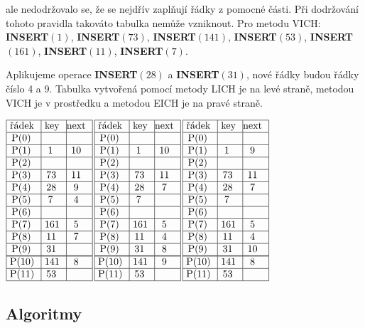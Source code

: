 \documentclass[a4paper,12pt]{article}
\begin{document}
ale nedodržovalo se, že se nejdřív zaplňují řádky z 
pomocné části.  Při dodržování tohoto pravidla takováto tabulka 
nemůže vznik\-nout.\newline 
Pro metodu VICH:\newline 
{\bf INSERT$(1)$}, {\bf INSERT$(73)$}, {\bf INSERT$(141)$}, 
{\bf INSERT$(53)$}, {\bf INSERT$(161)$},\newline 
{\bf INSERT$(11)$}, {\bf INSERT$(7)$}. 

Aplikujeme operace {\bf INSERT$(28)$} a {\bf INSERT$(31
)$}, nové řád\-ky 
budou řádky číslo 4 a 9. Tabulka vytvořená pomocí 
metody LICH je na levé straně, metodou VICH je v 
prostředku a metodou EICH je na pravé straně.

$\vbox {\hbox{\vtop{\offinterlineskip\halign{\strut\vrule\ # & \vrule\ # & \vrule\hfil # \hfil\vrule\cr\noalign{\hrule}řádek & key & next \hfil\cr\noalign{\hrule}P(0) & &\hfill \cr\noalign{\hrule}P(1) & 1 & 10 \cr\noalign{\hrule}P(2) & &\hfill \cr\noalign{\hrule}P(3) & 73 & 11 \cr\noalign{\hrule}P(4) & 28 & 9 \cr\noalign{\hrule}P(5) & 7 & 4 \cr\noalign{\hrule}P(6) &  &\hfill \cr\noalign{\hrule}P(7) & 161 & 5 \cr\noalign{\hrule}P(8) & 11 & 7 \cr\noalign{\hrule}P(9) & 31 &\hfill \cr\noalign{\hrule}\noalign{\hrule}P(10) & 141 & 8 \cr\noalign{\hrule}P(11) & 53 & \hfill \cr\noalign{\hrule}}}\,\vtop{\offinterlineskip\halign{\strut\vrule\ # & \vrule\ # & \vrule\hfil# \hfil\vrule\cr\noalign{\hrule}řádek & key & next \hfil\cr\noalign{\hrule}P(0) & &\hfill \cr\noalign{\hrule}P(1) & 1 & 10 \cr\noalign{\hrule}P(2) & &\hfill \cr\noalign{\hrule}P(3) & 73 & 11 \cr\noalign{\hrule}P(4) & 28 & 7 \cr\noalign{\hrule}P(5) & 7 & \hfill \cr\noalign{\hrule}P(6) &  &\hfill \cr\noalign{\hrule}P(7) & 161 & 5 \cr\noalign{\hrule}P(8) & 11 & 4 \cr\noalign{\hrule}P(9) & 31 & 8 \cr\noalign{\hrule}\noalign{\hrule}P(10) & 141 & 9 \cr\noalign{\hrule}P(11) & 53 & \hfill \cr\noalign{\hrule}}}\,\vtop{\offinterlineskip\halign {\strut\vrule\ # & \vrule\ # & \vrule \hfil # \hfil \vrule\cr\noalign{\hrule}řádek & key & next \hfil \cr\noalign{\hrule}P(0) & &\hfill \cr\noalign{\hrule}P(1) & 1 & 9 \cr\noalign{\hrule}P(2) & &\hfill \cr\noalign{\hrule}P(3) & 73 & 11 \cr\noalign{\hrule}P(4) & 28 & 7 \cr\noalign{\hrule}P(5) & 7 & \hfill \cr\noalign{\hrule}P(6) & & \hfill \cr\noalign{\hrule}P(7) & 161 & 5 \cr\noalign{\hrule}P(8) & 11 & 4  \cr\noalign{\hrule}P(9) & 31 & 10 \cr\noalign{\hrule}\noalign{\hrule}P(10) & 141 & 8 \cr\noalign{\hrule}P(11) & 53 & \hfill \cr\noalign{\hrule}}}}}$

\subsection{
Algoritmy
}
\end{document}
